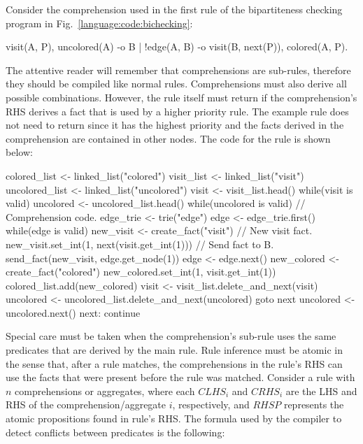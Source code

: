 Consider the comprehension used in the first rule of the bipartiteness checking
program in Fig.~\ref{language:code:bichecking}:

\begin{Code}
visit(A, P),
uncolored(A)
   -o {B | !edge(A, B) -o visit(B, next(P))},
      colored(A, P).
\end{Code}

The attentive reader will remember that comprehensions are sub-rules, therefore
they should be compiled like normal rules. Comprehensions must also derive all
possible combinations. However, the rule itself must return if the
comprehension's RHS derives a fact that is used by a higher priority rule. The
example rule does not need to return since it has the highest priority and the
 facts derived in the comprehension are contained in other nodes.
The code for the rule is shown below:

\begin{LineCode}
colored_list <- linked_list("colored")
visit_list <- linked_list("visit")
uncolored_list <- linked_list("uncolored")
visit <- visit_list.head()
while(visit is valid)
{
   uncolored <- uncolored_list.head()
   while(uncolored is valid)
   {
      // Comprehension code.
      edge_trie <- trie("edge")
      edge <- edge_trie.first()
      while(edge is valid)
      {
         new_visit <- create_fact("visit") // New visit fact.
         new_visit.set_int(1, next(visit.get_int(1)))
         // Send fact to B.
         send_fact(new_visit, edge.get_node(1))
         edge <- edge.next()
      }
      new_colored <- create_fact("colored")
      new_colored.set_int(1, visit.get_int(1))
      colored_list.add(new_colored)
      visit <- visit_list.delete_and_next(visit)
      uncolored <- uncolored_list.delete_and_next(uncolored)
      goto next
   }
   uncolored <- uncolored.next()
next:
   continue
}
\end{LineCode}

Special care must be taken when the comprehension's sub-rule uses the same
predicates that are derived by the main rule. Rule inference must be atomic in
the sense that, after a rule matches, the comprehensions in the rule's RHS can
use the facts that were present before the rule was matched. Consider a rule
with $n$ comprehensions or aggregates, where each $CLHS_i$ and $CRHS_i$ are the
LHS and RHS of the comprehension/aggregate $i$, respectively, and $RHSP$
represents the atomic propositions found in rule's RHS. The formula used by the
compiler to detect conflicts between predicates is the following:

